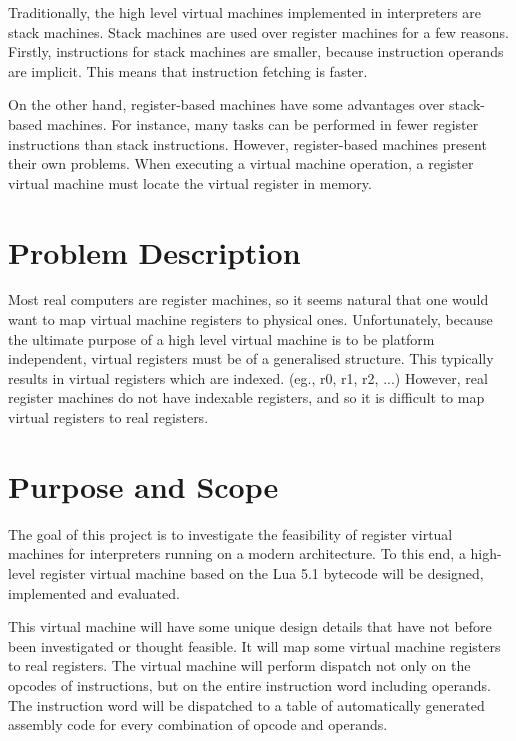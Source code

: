 	Traditionally, the high level virtual machines implemented in interpreters are stack machines. Stack machines are used over register machines for a few reasons. Firstly, instructions for stack machines are smaller, because instruction operands are implicit.  This means that instruction fetching is faster. 
	
	On the other hand, register-based machines have some advantages over stack-based machines. For instance, many tasks can be performed in fewer register instructions than stack instructions. \citep{caseregistervm} However, register-based machines present their own problems. When executing a virtual machine operation, a register virtual machine must locate the virtual register in memory. 
	
	\section{Problem Description}
	Most real computers are register machines,  so it seems natural that one would want to map virtual machine registers to physical ones. Unfortunately, because the ultimate purpose of a high level virtual machine is to be platform independent, virtual registers must be of a generalised structure. This typically results in virtual registers which are indexed. (eg., r0, r1, r2, ...) However, real register machines do not have indexable registers, and so it is difficult to map virtual registers to real registers. 
	
	\section{Purpose and Scope}
	The goal of this project is to investigate the feasibility of register virtual machines for interpreters running on a modern architecture. To this end, a high-level register virtual machine based on the Lua 5.1 bytecode will be designed, implemented and evaluated.
	
	This virtual machine will have some unique design details that have not before been investigated or thought feasible. It will map some virtual machine registers to real registers. The virtual machine will perform dispatch not only on the opcodes of instructions, but on the entire instruction word including operands. The instruction word will be dispatched to a table of automatically generated assembly code for every combination of opcode and operands. 
	
